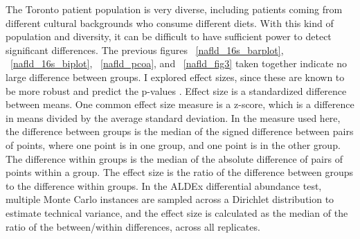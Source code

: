 The Toronto patient population is very diverse, including patients coming from different cultural backgrounds who consume different diets. With this kind of population and diversity, it can be difficult to have sufficient power to detect significant differences. The previous figures ~\ref{nafld_16s_barplot}, ~\ref{nafld_16s_biplot}, ~\ref{nafld_pcoa}, and ~\ref{nafld_fig3} taken together indicate no large difference between groups. I explored effect sizes, since these are known to be more robust and predict the p-values \cite{halsey2015fickle}. Effect size is a standardized difference between means. One common effect size measure is a z-score, which is a difference in means divided by the average standard deviation. In the measure used here, the difference between groups is the median of the signed difference between pairs of points, where one point is in one group, and one point is in the other group. The difference within groups is the median of the absolute difference of pairs of points within a group. The effect size is the ratio of the difference between groups to the difference within groups. In the ALDEx differential abundance test, multiple Monte Carlo instances are sampled across a Dirichlet distribution to estimate technical variance, and the effect size is calculated as the median of the ratio of the between/within differences, across all replicates.

